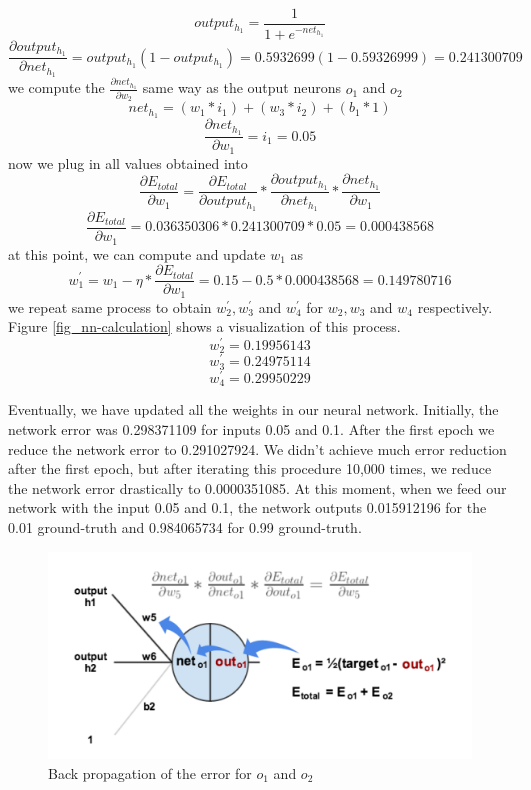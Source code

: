 \documentclass[master]{thesis-uestc}
\begin{document}
\[ output_{h_1} = \frac{1}{1 + e^{-net_{h_1}}} \]
\[ \frac{\partial output_{h_1}}{\partial net_{h_1}} = output_{h_1}(1 - output_{h_1}) = 0.5932699(1 - 0.59326999) = 0.241300709  \]
we compute the $\frac{\partial net_{h_1}}{\partial w_2}$ same way as the output neurons $o_1$ and $o_2$
\[ net_{h_1} = (w_1 * i_1) + (w_3 * i_2) + (b_1 * 1) \]
\[ \frac{\partial net_{h_1}}{\partial w_1} = i_1 = 0.05 \]
now we plug in all values obtained into
\[ \frac{\partial E_{total}}{\partial w_1} = \frac{\partial E_{total}}{\partial output_{h_1}} * \frac{\partial output_{h_1}}{\partial net_{h_1}} * \frac{\partial net_{h_1}}{\partial w_1} \]
\[ \frac{\partial E_{total}}{\partial w_1} = 0.036350306 * 0.241300709 * 0.05 = 0.000438568 \]
at this point, we can compute and update $w_1$ as
\[ w_{1}^{\prime} = w_1 - \eta * \frac{\partial E_{total}}{\partial w_1} = 0.15 - 0.5 * 0.000438568 = 0.149780716 \]
we repeat same process to obtain $w_{2}^{\prime}, w_{3}^{\prime}$ and $w_{4}^{\prime}$ for $w_2, w_3$ and $w_4$ respectively. Figure \ref{fig_nn-calculation} shows a visualization of this process.
\[ w_{2}^{\prime} = 0.19956143 \]
\[ w_{3}^{\prime} = 0.24975114 \]
\[ w_{4}^{\prime} = 0.29950229 \]

Eventually, we have updated all the weights in our neural network. Initially, the network error was 0.298371109 for inputs 0.05 and 0.1. After the first epoch we reduce the network error to 0.291027924. We didn't achieve much error reduction after the first epoch, but after iterating this procedure 10,000 times, we reduce the network error drastically to 0.0000351085. At this moment, when we feed our network with the input 0.05 and 0.1, the network outputs 0.015912196 for the 0.01 ground-truth and 0.984065734 for 0.99 ground-truth.

\begin{figure}[ht]
\includegraphics[width=5in]{pic/output_1_backprop-4.png}
\caption{Back propagation of the error for $o_1$ and $o_2$}
\label{output_1_backprop}
\end{figure}
\end{document}
